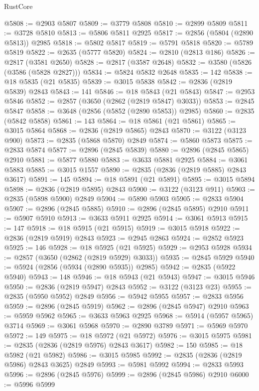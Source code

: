 \begin{lexlean}{RustCore}
\begin{coremodule}
@5808 := @2903 @5807
@5809 := @3779 @5808
@5810 := @2899 @5809
@5811 := @3728 @5810
@5813 := @5806 @5811 @2925
@5817 := @2856 (@5804 (@2890 @5813)) @2985
@5818 := @5802 @5817
@5819 := @5791 @5818
@5820 := @5789 @5819
@5822 := @2635 (@5777 @5820)
@5824 := @2810 (@2813 @186)
@5826 := @2817 (@3581 @2650)
@5828 := @2817 (@3587 @2648)
@5832 := @3580 (@5826 (@3586 (@5828 @2827)))
@5834 := @5824 @5832 @2648
@5835 := 142
@5838 := @18 @5835 (@21 @5835)
@5839 := @3015 @5838
@5842 := @2836 (@2819 @5839) @2843
@5843 := 141
@5846 := @18 @5843 (@21 @5843)
@5847 := @2953 @5846
@5852 := @2857 (@3650 (@2862 (@2819 @5847) @3033))
@5853 := @2845 @5847
@5858 := @3648 (@2856 (@5852 (@2890 @5853)) @2985)
@5860 := @2835 (@5842 @5858)
@5861 := 143
@5864 := @18 @5861 (@21 @5861)
@5865 := @3015 @5864
@5868 := @2836 (@2819 @5865) @2843
@5870 := @3122 (@3123 @900)
@5873 := @2835 (@5868 @5870) @2849
@5874 := @5860 @5873
@5875 := @2833 @5874
@5877 := @2896 (@2845 @5839)
@5880 := @2896 (@2845 @5865) @2910
@5881 := @5877 @5880
@5883 := @3633 @5881 @2925
@5884 := @3061 @5883
@5885 := @3015 @1557
@5890 := @2835 (@2836 (@2819 @5885) @2843 @3617)
@5891 := 145
@5894 := @18 @5891 (@21 @5891)
@5895 := @3015 @5894
@5898 := @2836 (@2819 @5895) @2843
@5900 := @3122 (@3123 @911)
@5903 := @2835 (@5898 @5900) @2849
@5904 := @5890 @5903
@5905 := @2833 @5904
@5907 := @2896 (@2845 @5885)
@5910 := @2896 (@2845 @5895) @2910
@5911 := @5907 @5910
@5913 := @3633 @5911 @2925
@5914 := @3061 @5913
@5915 := 147
@5918 := @18 @5915 (@21 @5915)
@5919 := @3015 @5918
@5922 := @2836 (@2819 @5919) @2843
@5923 := @2945 @2863
@5924 := @2852 @5923
@5925 := 146
@5928 := @18 @5925 (@21 @5925)
@5929 := @2953 @5928
@5934 := @2857 (@3650 (@2862 (@2819 @5929) @3033))
@5935 := @2845 @5929
@5940 := @5924 (@2856 (@5934 (@2890 @5935)) @2985)
@5942 := @2835 (@5922 @5940)
@5943 := 148
@5946 := @18 @5943 (@21 @5943)
@5947 := @3015 @5946
@5950 := @2836 (@2819 @5947) @2843
@5952 := @3122 (@3123 @23)
@5955 := @2835 (@5950 @5952) @2849
@5956 := @5942 @5955
@5957 := @2833 @5956
@5959 := @2896 (@2845 @5919)
@5962 := @2896 (@2845 @5947) @2910
@5963 := @5959 @5962
@5965 := @3633 @5963 @2925
@5968 := @5914 (@5957 @5965) @3714
@5969 := @3061 @5968
@5970 := @2890 @3789
@5971 := @5969 @5970
@5972 := 149
@5975 := @18 @5972 (@21 @5972)
@5976 := @3015 @5975
@5981 := @2835 (@2836 (@2819 @5976) @2843 @3617)
@5982 := 150
@5985 := @18 @5982 (@21 @5982)
@5986 := @3015 @5985
@5992 := @2835 (@2836 (@2819 @5986) @2843 @3625) @2849
@5993 := @5981 @5992
@5994 := @2833 @5993
@5996 := @2896 (@2845 @5976)
@5999 := @2896 (@2845 @5986) @2910
@6000 := @5996 @5999

\end{coremodule}
\end{lexlean}
